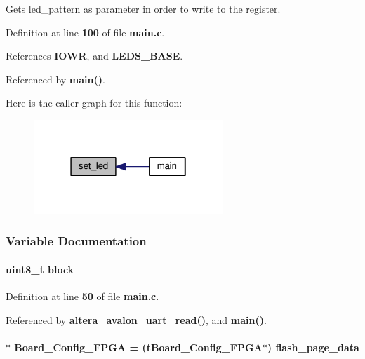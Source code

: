 Gets led\+\_\+pattern as parameter in order to write to the register. 



Definition at line {\bf 100} of file {\bf main.\+c}.



References {\bf I\+O\+WR}, and {\bf L\+E\+D\+S\+\_\+\+B\+A\+SE}.



Referenced by {\bf main()}.



Here is the caller graph for this function\+:
\nopagebreak
\begin{figure}[H]
\begin{center}
\leavevmode
\includegraphics[width=202pt]{d0/d29/main_8c_a1dc21bcdb3c128efef740a65212cae7b_icgraph}
\end{center}
\end{figure}




\subsubsection{Variable Documentation}
\paragraph[{block}]{\setlength{\rightskip}{0pt plus 5cm}uint8\+\_\+t block}\label{main_8c_a8b14b87ec66185f41f7b6590c0605e18}


Definition at line {\bf 50} of file {\bf main.\+c}.



Referenced by {\bf altera\+\_\+avalon\+\_\+uart\+\_\+read()}, and {\bf main()}.

\paragraph[{Board\+\_\+\+Config\+\_\+\+F\+P\+GA}]{$\ast$ Board\+\_\+\+Config\+\_\+\+F\+P\+GA = ({\bf t\+Board\+\_\+\+Config\+\_\+\+F\+P\+GA}$\ast$) {\bf flash\+\_\+page\+\_\+data}}\label{main_8c_a64bbd4a80791498e01bee10c9e986362}


